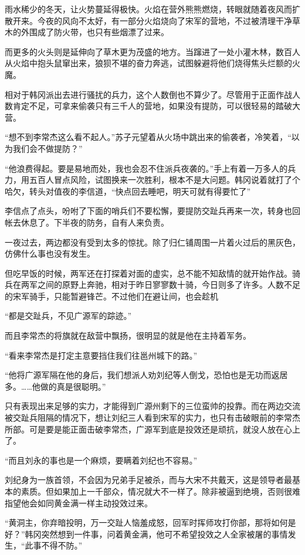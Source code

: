 雨水稀少的冬天，让火势蔓延得极快。火焰在营外熊熊燃烧，转眼就随着夜风而扩散开来。今夜的风向不太好，有一部分火焰烧向了宋军的营地，不过被清理干净草木的外围成了防火带，也只有些烟漂了过来。

而更多的火头则是延伸向了草木更为茂盛的地方。当蹿进了一处小灌木林，数百人从火焰中抱头鼠窜出来，狼狈不堪的奋力奔逃，试图躲避将他们烧得焦头烂额的火魔。

相对于韩冈派出去进行骚扰的兵力，这个人数倒也不算少了。尽管用于正面作战人数肯定不足，可拿来偷袭只有三千人的营地，如果没有提防，可以很轻易的踏破大营。

“想不到李常杰这么看不起人。”苏子元望着从火场中跳出来的偷袭者，冷笑着，“以为我们会不做提防？”

“他浪费得起。要是易地而处，我也会忍不住派兵夜袭的。”手上有着一万多人的兵力，用五百人冒点风险，试图换来一次胜利，根本不是大问题。韩冈说着就打了个哈欠，转头对值夜的李信道，“快点回去睡吧，明天可就有得要忙了”

李信点了点头，吩咐了下面的哨兵们不要松懈，要提防交趾兵再来一次，转身也回帐去休息了。下半夜的防务，自有人来负责。

一夜过去，两边都没有受到太多的惊扰。除了归仁铺周围一片着火过后的黑灰色，仿佛什么事也没有发生。

但吃早饭的时候，两军还在打探着对面的虚实，总不能不知敌情的就开始作战。骑兵在两军之间的原野上奔驰，相对于昨日寥寥数十骑，今日则多了许多。人数不足的宋军骑手，只能暂避锋芒。不过他们在避让间，也会趁机

“都是交趾兵，不见广源军的踪迹。”

而且李常杰的将旗就在敌营中飘扬，很明显的就是他在主持着军务。

“看来李常杰是打定主意要挡住我们往邕州城下的路。”

“他将广源军隔在他的身后，我们想派人劝刘纪等人倒戈，恐怕也是无功而返居多。……他做的真是很聪明。”

只有表现出来足够的实力，才能得到广源州剩下的三位蛮帅的投靠。而在两边交流被交趾兵阻隔的情况下，想让刘纪三人看到宋军的实力，也只有击破眼前的李常杰所部。可是要是能正面击破李常杰，广源军到底是投效还是顽抗，就没人放在心上了。

“而且刘永的事也是一个麻烦，要瞒着刘纪也不容易。”

刘纪身为一族首领，不会因为兄弟手足被杀，而与大宋不共戴天，这是领导者最基本的素质。但如果加上一千部众，情况就大不一样了。除非被逼到绝境，否则很难指望他会如同黄金满一样主动投效过来。

“黄洞主，你弃暗投明，万一交趾人恼羞成怒，回军时挥师攻打你部，那将如何是好？”韩冈突然想到一件事，问着黄金满，他可不希望投效之人全家被屠的事情发生，“此事不得不防。”

